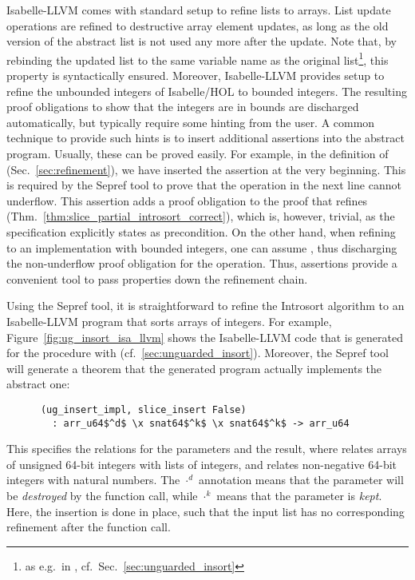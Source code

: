 \documentclass[sigplan,10pt,anonymous,review]{acmart}\settopmatter{printfolios=true,printccs=false,printacmref=false}
\theoremstyle{definition}
\begin{document}
  Isabelle-LLVM comes with standard setup to refine lists to arrays. List update operations are refined to destructive array element updates,
  as long as the old version of the abstract list is not used any more after the update. Note that, by rebinding the updated list to the same
  variable name as the original list\footnote{as e.g.\ in , cf.\ Sec.~\ref{sec:unguarded_insort}}, this property is syntactically ensured. Moreover, Isabelle-LLVM provides setup to refine the unbounded integers of Isabelle/HOL to bounded integers.
  The resulting proof obligations to show that the integers are in bounds are discharged automatically, but typically require some hinting from the user.
  A common technique to provide such hints is to insert additional assertions into the abstract program.
  Usually, these can be proved easily. For example, in the definition of  (Sec.~\ref{sec:refinement}),
  we have inserted the assertion  at the very beginning. This is required by the Sepref tool to prove that the operation 
  in the next line cannot underflow. This assertion adds a proof obligation to the proof that  refines  (Thm.~\ref{thm:slice_partial_introsort_correct}), which is, however, trivial, as the specification
  explicitly states  as precondition. On the other hand, when refining  to an implementation with bounded
  integers, one can assume , thus discharging the non-underflow proof obligation for the  operation.
  Thus, assertions provide a convenient tool to pass properties down the refinement chain.

  Using the Sepref tool, it is straightforward to refine the Introsort algorithm to an Isabelle-LLVM program that sorts arrays of integers.
  For example, Figure~\ref{fig:ug_insort_isa_llvm} shows the Isabelle-LLVM code that is generated for the  procedure with  (cf.~\ref{sec:unguarded_insort}).
  Moreover, the Sepref tool will generate a theorem that the generated program actually implements the abstract one:
  \begin{theorem}
    \begin{lstlisting}
      (ug_insert_impl, slice_insert False)
        : arr_u64$^d$ \x snat64$^k$ \x snat64$^k$ -> arr_u64
    \end{lstlisting}
  \end{theorem}
  This specifies the relations for the parameters and the result, where  relates arrays of unsigned 64-bit integers with lists of integers,
  and  relates non-negative 64-bit integers with natural numbers.
  The $\cdot^d$ annotation means that the parameter will be \emph{destroyed} by the function call,
  while $\cdot^k$ means that the parameter is \emph{kept}.
  Here, the insertion is done in place, such that the input list has no corresponding refinement after the function call.
\end{document}
